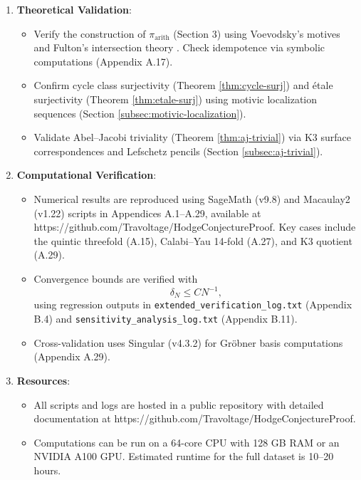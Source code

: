 \documentclass[11pt]{article}
\begin{document}
\begin{enumerate}
    \item \textbf{Theoretical Validation}:
    \begin{itemize}
        \item Verify the construction of \(\pi_{\mathrm{arith}}\) (Section 3) using Voevodsky’s motives \cite{voevodsky2000} and Fulton’s intersection theory \cite{fulton1984}. Check idempotence via symbolic computations (Appendix A.17).
        \item Confirm cycle class surjectivity (Theorem \ref{thm:cycle-surj}) and étale surjectivity (Theorem \ref{thm:etale-surj}) using motivic localization sequences (Section \ref{subsec:motivic-localization}).
        \item Validate Abel–Jacobi triviality (Theorem \ref{thm:aj-trivial}) via K3 surface correspondences and Lefschetz pencils (Section \ref{subsec:aj-trivial}).
    \end{itemize}
\item \textbf{Computational Verification}:
\begin{itemize}
    \item \parbox{0.9\textwidth}{Numerical results are reproduced using SageMath (v9.8) and Macaulay2 (v1.22) scripts in Appendices A.1--A.29, available at https://github.com/Travoltage/HodgeConjectureProof. Key cases include the quintic threefold (A.15), Calabi--Yau 14-fold (A.27), and K3 quotient (A.29).}
    \item Convergence bounds are verified with
    \begin{dmath}
    \delta_N \leq C N^{-1},
    \end{dmath}
    using regression outputs in \texttt{extended_verification_log.txt} (Appendix B.4) and \texttt{sensitivity_analysis_log.txt} (Appendix B.11).
    \item Cross-validation uses Singular (v4.3.2) for Gröbner basis computations (Appendix A.29).
\end{itemize}
    \item \textbf{Resources}:
    \begin{itemize}
        \item All scripts and logs are hosted in a public repository with detailed documentation at {https://github.com/Travoltage/HodgeConjectureProof}.
        \item Computations can be run on a 64-core CPU with 128 GB RAM or an NVIDIA A100 GPU. Estimated runtime for the full dataset is 10–20 hours.
    \end{itemize}
\end{enumerate}
\end{document}
